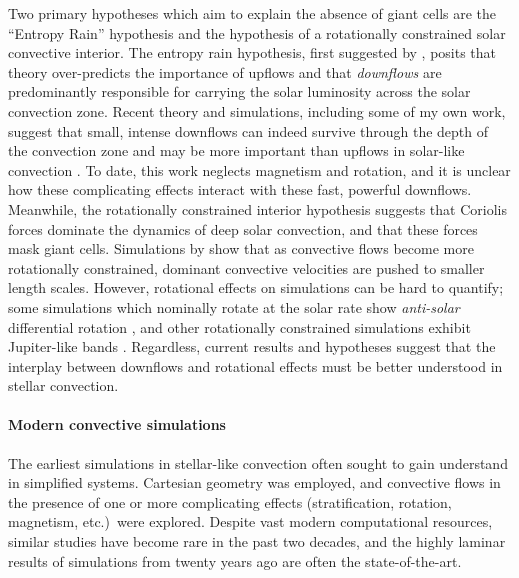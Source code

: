 \documentclass[11pt, preprint]{aastex}
\begin{document}
Two primary hypotheses which aim to explain the absence of giant cells are the ``Entropy Rain'' hypothesis and the hypothesis of a rotationally constrained solar convective interior.
The entropy rain hypothesis, first suggested by \citet{spruit1997}, posits that theory over-predicts the importance of upflows and that \emph{downflows} are predominantly responsible for carrying the solar luminosity across the solar convection zone.
Recent theory and simulations, including some of my own work, suggest that small, intense downflows can indeed survive through the depth of the convection zone and may be more important than upflows in solar-like convection \citep{brandenburg2016, kapyla&all2017, andersLB2019}.
To date, this work neglects magnetism and rotation, and it is unclear how these complicating effects interact with these fast, powerful downflows.
Meanwhile, the rotationally constrained interior hypothesis suggests that Coriolis forces dominate the dynamics of deep solar convection, and that these forces mask giant cells.
Simulations by \citet{featherstone&hindman2016} show that as convective flows become more rotationally constrained, dominant convective velocities are pushed to smaller length scales.
However, rotational effects on simulations can be hard to quantify; some simulations which nominally rotate at the solar rate show \emph{anti-solar} differential rotation \citep{gastine&all2014}, and other rotationally constrained simulations exhibit Jupiter-like bands \citep{brun&all2017}.
Regardless, current results and hypotheses suggest that the interplay between downflows and rotational effects must be better understood in stellar convection.

\vspace{-0.5cm}
\paragraph{Modern convective simulations}
\label{sct:modern_simulations}
The earliest simulations in stellar-like convection \citep{graham1975, hurlburt&all1984, cattaneo&all1991, brummell&all1996, brummell&all1998} often sought to gain understand in simplified systems.
Cartesian geometry was employed, and convective flows in the presence of one or more complicating effects (stratification, rotation, magnetism, etc.)~were explored.
Despite vast modern computational resources, similar studies \citep[e.g.,][]{wood&brummell2012, anders&brown2017, wood&brummell2018} have become rare in the past two decades, and the highly laminar results of simulations from twenty years ago are often the state-of-the-art.
\end{document}
